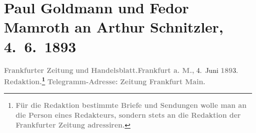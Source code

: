 

         
         \renewcommand{\erwaehntePersonen}{Personen: Samuel Fischer, Carl Freund, Wilhelm Friedrich, Max Jeckel, Edgar Pierson, Salo Schottlaender}
         \renewcommand{\erwaehnteInstitutionen}{Institutionen: E. Pierson’s Verlag, Frankfurter Zeitung, Freund & Jeckel, S. Fischer Verlag, S. Schottländer, Verlag Wilhelm Friedrich}
         \renewcommand{\erwaehnteOrte}{Orte: Altonaer Straße, Berlin, Breslau, Dresden, Frankfurt am Main, Köthenerstraße, Leipzig, Wien}
         \renewcommand{\erwaehnteWerke}{Werke: Frankfurter Zeitung}
               \section[Paul Goldmann und Fedor Mamroth an Arthur Schnitzler, 4. 6. 1893]{ Paul Goldmann und Fedor Mamroth an Arthur Schnitzler,
               4. 6. 1893}\nopagebreak{}\rehead{ }\begin{ledgroupsized}[t]{13cm}\normalsize\beginnumbering \toendnotes[C]{\smallbreak\pagebreak[2]} 
\toendnotes[C]{\smallbreak}\pstart
           \noindent{}{\pb}\textcolor{gray}{\textbf{\textbf{Frankfurter Zeitung}}}\pend
           \pstart
           \textcolor{gray}{\textbf{und}}\pend
           \pstart
           \textcolor{gray}{\textbf{\textbf{Handelsblatt}.}}\hfill \textcolor{gray}{\textbf{Frankfurt a. M.,}}{ }4. Juni \textcolor{gray}{\textbf{189}}3.\pend
           \pstart
           \textcolor{gray}{\textbf{\textbf{Redaktion.}\footnote{\noindent{}\textcolor{gray}{\textbf{Für die Redaktion bestimmte Briefe und Sendungen wolle
                              man  an die Person eines Redakteurs,
                              sondern stets \textbf{an die Redaktion der Frankfurter Zeitung} adressiren.}}}}}\pend
           \pstart
           \textcolor{gray}{\textbf{\textbf{Telegramm-Adresse:}}}\pend
           \pstart
           \textcolor{gray}{\textbf{\textbf{Zeitung Frankfurt
                        Main.}}}\pend

\end{ledgroupsized}
